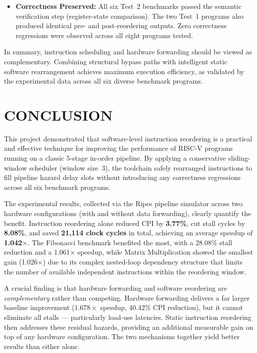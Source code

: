 \documentclass[11pt]{report}
\begin{document}
\begin{itemize}
    \item \textbf{Correctness Preserved:} All six Test~2 benchmarks passed the semantic verification step (register-state comparison). The two Test~1 programs also produced identical pre- and post-reordering outputs. Zero correctness regressions were observed across all eight programs tested.
\end{itemize}

In summary, instruction scheduling and hardware forwarding should be viewed as complementary. Combining structural bypass paths with intelligent static software rearrangement achieves maximum execution efficiency, as validated by the experimental data across all six diverse benchmark programs.

\newpage
\chapter{CONCLUSION}

This project demonstrated that software-level instruction reordering is a practical and effective technique for improving the performance of RISC-V programs running on a classic 5-stage in-order pipeline. By applying a conservative sliding-window scheduler (window size~3), the toolchain safely rearranged instructions to fill pipeline hazard delay slots without introducing any correctness regressions across all six benchmark programs.

The experimental results, collected via the Ripes pipeline simulator across two hardware configurations (with and without data forwarding), clearly quantify the benefit. Instruction reordering alone reduced CPI by \textbf{3.77\%}, cut stall cycles by \textbf{8.08\%}, and saved \textbf{21,114 clock cycles} in total, achieving an average speedup of \textbf{1.042$\times$}. The Fibonacci benchmark benefited the most, with a 28.08\% stall reduction and a 1.061$\times$ speedup, while Matrix Multiplication showed the smallest gain (1.026$\times$) due to its complex nested-loop dependency structure that limits the number of available independent instructions within the reordering window.

A crucial finding is that hardware forwarding and software reordering are \textit{complementary} rather than competing. Hardware forwarding delivers a far larger baseline improvement ($1.678\times$ speedup, 40.42\% CPI reduction), but it cannot eliminate all stalls --- particularly load-use latencies. Static instruction reordering then addresses these residual hazards, providing an additional measurable gain on top of any hardware configuration. The two mechanisms together yield better results than either alone.
\end{document}
